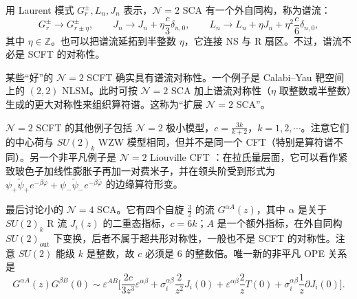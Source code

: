 用 Laurent 模式 $G^\pm_r,L_n,J_n$ 表示，$\mathcal{N}=2$ SCA 有一个外自同构，称为谱流：
\begin{equation}
  \label{eq:4-32}
  G^\pm_r\to G^\pm_{r\pm\eta},\qquad J_n\to J_n+\eta\frac{c}{3}\delta_{n,0},\qquad L_n\to L_n+\eta J_n+\eta^2\frac{c}{6}\delta_{n,0},
\end{equation}
其中 $\eta\in\mathbb{Z}$。也可以把谱流延拓到半整数 $\eta$，它连接 NS 与 R 扇区。不过，谱流不必是 SCFT 的对称性。

某些“好”的 $\mathcal{N}=2$ SCFT 确实具有谱流对称性。一个例子是 Calabi--Yau 靶空间上的 $(2,2)$ NLSM。此时可按 $\mathcal{N}=2$ SCA 加上谱流对称性（$\eta$ 取整数或半整数）生成的更大对称性来组织算符谱。这称为“扩展 $\mathcal{N}=2$ SCA”\cite{r27,r28}。


$\mathcal{N}=2$ SCFT 的其他例子包括 $\mathcal{N}=2$ 极小模型，$c=\frac{3k}{k+2}$，$k=1,2,\cdots$。注意它们的中心荷与 $SU(2)_k$ WZW 模型相同，但并不是同一个 CFT（特别是算符谱不同）。另一个非平凡例子是 $\mathcal{N}=2$ Liouville CFT \cite{r29}：在拉氏量层面，它可以看作紧致玻色子加线性膨胀子再加一对费米子，并在领头阶受到形式为 $\psi_+\tilde\psi_+e^{-\beta\varphi}+\psi_-\tilde\psi_-e^{-\beta\bar\varphi}$ 的边缘算符形变。

最后讨论小的 $\mathcal{N}=4$ SCA。它有四个自旋 $\frac32$ 的流 $G^{\alpha A}(z)$，其中 $\alpha$ 是关于 $SU(2)_k$ R 流 $J_i(z)$ 的二重态指标，$c=6k$；$A$ 是一个额外指标，在外自同构 $SU(2)_{\mathrm{out}}$ 下变换，后者不属于超共形对称性，一般也不是 SCFT 的对称性。注意 $SU(2)$ 能级 $k$ 是整数，故 $c$ 必须是 $6$ 的整数倍。唯一新的非平凡 OPE 关系是
\begin{equation}
  \label{eq:4-33}
  G^{\alpha A}(z)G^{\beta B}(0)\sim\varepsilon^{AB}\Big[\frac{2c}{3z^3}\varepsilon^{\alpha\beta}
  +\sigma_i^{\alpha\beta}\frac{2}{z^2}J_i(0)+\varepsilon^{\alpha\beta}\frac{2}{z}T(0)
  +\sigma_i^{\alpha\beta}\frac{1}{z}\partial J_i(0)\Big].
\end{equation}


